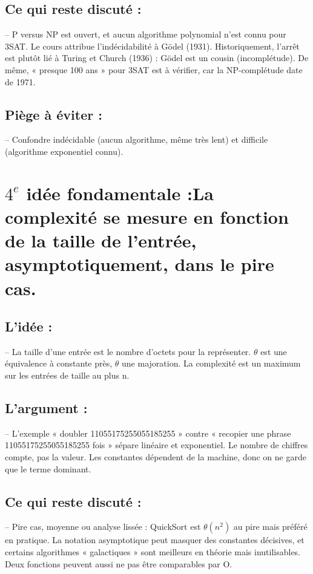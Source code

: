 \documentclass{article}
\begin{document}
\subsection*{\textbf{Ce qui reste discuté} :}
\qquad -- P versus NP est ouvert, et aucun algorithme polynomial n'est connu pour 3SAT. Le cours attribue l'indécidabilité à Gödel (1931). Historiquement, l'arrêt est plutôt lié à Turing et Church (1936) : Gödel est un cousin (incomplétude). De même, « presque 100 ans » pour 3SAT est à vérifier, car la NP-complétude date de 1971.


\subsection*{\textbf{Piège à éviter} :}
\qquad -- Confondre indécidable (aucun algorithme, même très lent) et difficile (algorithme exponentiel connu).


\section*{\textbf{$4^e$ idée fondamentale} :La complexité se mesure en fonction de la taille de l'entrée, asymptotiquement, dans le pire cas.}


\subsection*{\textbf{L'idée} :}
\qquad -- La taille d'une entrée est le nombre d'octets pour la représenter. $\theta$ est une équivalence à constante près, $\theta$ une majoration. La complexité est un maximum sur les entrées de taille au plus n.


\subsection*{\textbf{L'argument} :}
\qquad -- L'exemple « doubler 11055175255055185255 » contre « recopier une phrase 11055175255055185255 fois » sépare linéaire et exponentiel. Le nombre de chiffres compte, pas la valeur. Les constantes dépendent de la machine, donc on ne garde que le terme dominant.


\subsection*{\textbf{Ce qui reste discuté} :}
\qquad -- Pire cas, moyenne ou analyse lissée : QuickSort est $\theta(n^2)$ au pire mais préféré en pratique. La notation asymptotique peut masquer des constantes décisives, et certains algorithmes « galactiques » sont meilleurs en théorie mais inutilisables. Deux fonctions peuvent aussi ne pas être comparables par O.
\end{document}
